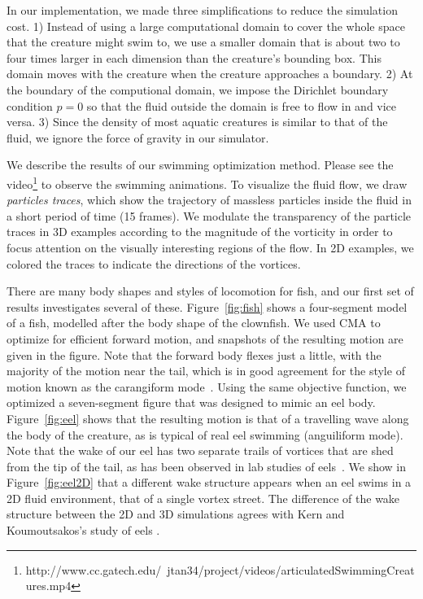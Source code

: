 In our implementation, we made three simplifications to reduce the
simulation cost. 1) Instead of using a large computational domain to cover
the whole space that the creature might swim to, we use a smaller domain
that is about two to four times larger in each dimension than the
creature's bounding box. This domain moves with the creature when the
creature approaches a boundary. 2) At the boundary of the computional
domain, we impose the Dirichlet boundary condition $p=0$ so that the fluid
outside the domain is free to flow in and vice versa. 3) Since the density
of most aquatic creatures is similar to that of the fluid, we ignore the force of gravity in our simulator.

We describe the results of our swimming optimization method.  Please see the video\footnote{http://www.cc.gatech.edu/~jtan34/project/videos/articulatedSwimmingCreatures.mp4} to observe the swimming
animations.  To visualize the fluid flow, we draw \emph{particles traces},
which show the trajectory of massless particles inside the fluid in a
short period of time (15 frames). We modulate the transparency of the
particle traces in 3D examples according to the magnitude of the vorticity
in order to focus attention on the visually interesting regions of the
flow.  In 2D examples, we colored the traces to indicate the directions of
the vortices.


There are many body shapes and styles of locomotion for fish, and our
first set of results investigates several of these.  Figure~\ref{fig:fish}
shows a four-segment model of a fish, modelled after the body shape of the
clownfish.  We used CMA to optimize for efficient forward motion, and snapshots of the resulting motion are given in the figure.  Note that the
forward body flexes just a little, with the majority of the motion near
the tail, which is in good agreement for the style of motion known as the
carangiform mode~\cite{lindsey1978form}.  Using the same objective
function, we optimized a seven-segment figure that was designed to mimic
an eel body.  Figure~\ref{fig:eel} shows that the resulting motion is that
of a travelling wave along the body of the creature, as is typical of real
eel swimming (anguiliform mode).  Note that the wake of our eel has two
separate trails of vortices that are shed from the tip of the tail, as has
been observed in lab studies of eels~\cite{tytell2004hydrodynamics}. We show in Figure~\ref{fig:eel2D} that a different wake structure appears when an eel swims in a 2D fluid environment, that of a single vortex street. The difference of the wake structure between the 2D and 3D simulations agrees with Kern and Koumoutsakos's study of eels \cite{kern2006simulations}.


